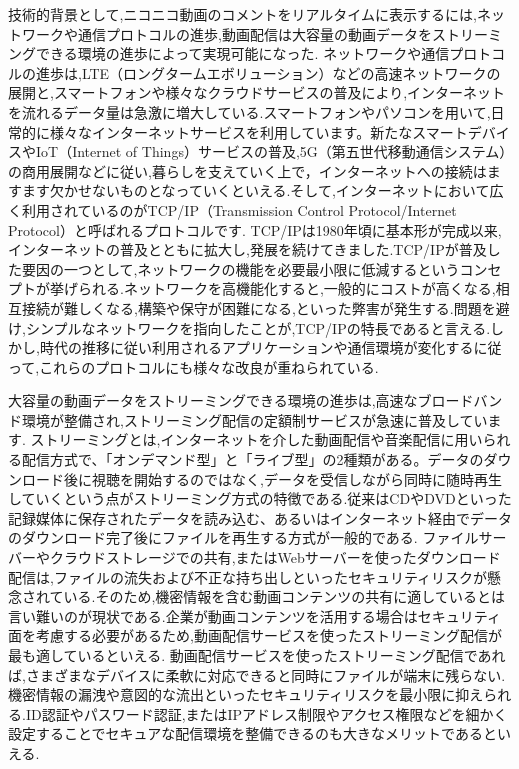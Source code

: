 技術的背景として,ニコニコ動画のコメントをリアルタイムに表示するには,ネットワークや通信プロトコルの進歩,動画配信は大容量の動画データをストリーミングできる環境の進歩によって実現可能になった.
ネットワークや通信プロトコルの進歩は,LTE（ロングタームエボリューション）などの高速ネットワークの展開と,スマートフォンや様々なクラウドサービスの普及により,インターネットを流れるデータ量は急激に増大している.スマートフォンやパソコンを用いて,日常的に様々なインターネットサービスを利用しています。新たなスマートデバイスやIoT（Internet of Things）サービスの普及,5G（第五世代移動通信システム）の商用展開などに従い,暮らしを支えていく上で，インターネットへの接続はますます欠かせないものとなっていくといえる.そして,インターネットにおいて広く利用されているのがTCP/IP（Transmission Control Protocol/Internet Protocol）と呼ばれるプロトコルです.
TCP/IPは1980年頃に基本形が完成以来,インターネットの普及とともに拡大し,発展を続けてきました.TCP/IPが普及した要因の一つとして,ネットワークの機能を必要最小限に低減するというコンセプトが挙げられる.ネットワークを高機能化すると,一般的にコストが高くなる,相互接続が難しくなる,構築や保守が困難になる,といった弊害が発生する.問題を避け,シンプルなネットワークを指向したことが,TCP/IPの特長であると言える.しかし,時代の推移に従い利用されるアプリケーションや通信環境が変化するに従って,これらのプロトコルにも様々な改良が重ねられている.

大容量の動画データをストリーミングできる環境の進歩は,高速なブロードバンド環境が整備され,ストリーミング配信の定額制サービスが急速に普及しています.
ストリーミングとは,インターネットを介した動画配信や音楽配信に用いられる配信方式で、「オンデマンド型」と「ライブ型」の2種類がある。データのダウンロード後に視聴を開始するのではなく,データを受信しながら同時に随時再生していくという点がストリーミング方式の特徴である.従来はCDやDVDといった記録媒体に保存されたデータを読み込む、あるいはインターネット経由でデータのダウンロード完了後にファイルを再生する方式が一般的である.
ファイルサーバーやクラウドストレージでの共有,またはWebサーバーを使ったダウンロード配信は,ファイルの流失および不正な持ち出しといったセキュリティリスクが懸念されている.そのため,機密情報を含む動画コンテンツの共有に適しているとは言い難いのが現状である.企業が動画コンテンツを活用する場合はセキュリティ面を考慮する必要があるため,動画配信サービスを使ったストリーミング配信が最も適しているといえる.
動画配信サービスを使ったストリーミング配信であれば,さまざまなデバイスに柔軟に対応できると同時にファイルが端末に残らない.機密情報の漏洩や意図的な流出といったセキュリティリスクを最小限に抑えられる.ID認証やパスワード認証,またはIPアドレス制限やアクセス権限などを細かく設定することでセキュアな配信環境を整備できるのも大きなメリットであるといえる.	


